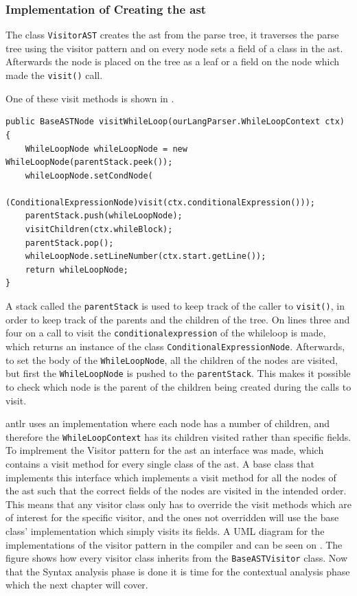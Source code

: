 \subsubsection*{Implementation of Creating the \acrshort{ast}}

The class \texttt{VisitorAST} creates the \acrshort{ast} from the parse tree, it traverses the parse tree using the visitor pattern and on every node sets a field of a class in the \acrshort{ast}. 
Afterwards the node is placed on the tree as a leaf or a field on the node which made the \texttt{visit()} call.

One of these visit methods is shown in .

\begin{lstlisting}[caption=The visit method for WhileLoopNode.,frame=tlrb,label={lst:VisitorASTCode}]
public BaseASTNode visitWhileLoop(ourLangParser.WhileLoopContext ctx) {
    WhileLoopNode whileLoopNode = new WhileLoopNode(parentStack.peek());
    whileLoopNode.setCondNode(
    	(ConditionalExpressionNode)visit(ctx.conditionalExpression()));
    parentStack.push(whileLoopNode);
    visitChildren(ctx.whileBlock);
    parentStack.pop();
    whileLoopNode.setLineNumber(ctx.start.getLine());
    return whileLoopNode;
}
\end{lstlisting}
A stack called the \texttt{parentStack} is used to keep track of the caller to \texttt{visit()}, in order to keep track of the parents and the children of the tree.
On lines three and four on  a call to visit the \texttt{conditionalexpression} of the whileloop is made, which returns an instance of the class \texttt{ConditionalExpressionNode}.
Afterwards, to set the body of the \texttt{WhileLoopNode}, all the children of the nodes are visited, but first the \texttt{WhileLoopNode} is pushed to the \texttt{parentStack}.
This makes it possible to check which node is the parent of the children being created during the calls to visit.

\acrshort{antlr} uses an implementation where each node has a number of children, and therefore the \texttt{WhileLoopContext} has its children visited rather than specific fields.
To implrement the Visitor pattern for the \acrshort{ast} an interface was made, which contains a visit method for every single class of the \acrshort{ast}.
A base class that implements this interface which implements a visit method for all the nodes of the \acrshort{ast} such that the correct fields of the nodes are visited in the intended order.
This means that any visitor class only has to override the visit methods which are of interest for the specific visitor, and the ones not overridden will use the base class' implementation which simply visits its fields.
A UML diagram for the implementations of the visitor pattern in the compiler and can be seen on .
The figure shows how every visitor class inherits from the \texttt{BaseASTVisitor} class.
Now that the Syntax analysis phase is done it is time for the contextual analysis phase which the next chapter will cover.


